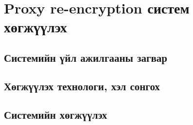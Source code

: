 
\chapter{Proxy re-encryption систем хөгжүүлэх} %
\label{Chapter3} %
\pagecolor{white}

\section{Системийн үйл ажилгааны загвар}

\section{Хөгжүүлэх технологи, хэл сонгох}

\section{Системийн хөгжүүлэх}